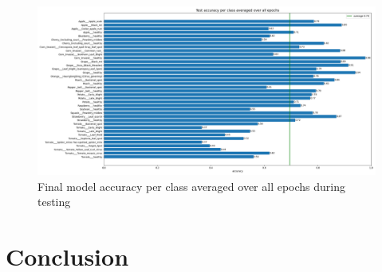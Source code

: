 \documentclass{BachelorBUI}
\begin{document}
    \begin{figure}[h]
        \centering
        \includegraphics[width=\textwidth]{final_test_accuracy_per_class_2024-11-25_11.16.14.png}
        \caption{\centering Final model accuracy per class averaged over all epochs during testing}
        \label{fig:final_test_accuracy_per_class}
    \end{figure}



\section{Conclusion}

\clearpage
\printbibliography
\end{document}
